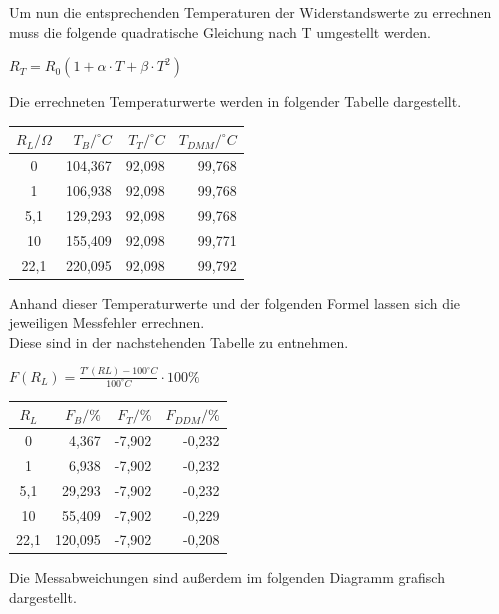 \documentclass[a4paper,11pt,oneside]{article}
\begin{document}
Um nun die entsprechenden Temperaturen der Widerstandswerte zu errechnen muss die folgende quadratische Gleichung nach T umgestellt werden.\\
\begin{center}
$R_T=R_0(1+\alpha \cdot T+\beta \cdot T^2)$\\


\end{center}
Die errechneten Temperaturwerte werden in folgender Tabelle dargestellt.
\begin{center}
\begin{tabular}{|c|r|r|r|}
\hline 
$R_L/\Omega$ & $T_B/^\circ C$ & $T_T/^\circ C$ & $T_{DMM}/^\circ C$ \\ 
\hline 
0 & 104,367& 92,098 & 99,768 \\ 
\hline 
1 & 106,938 & 92,098 & 99,768 \\ 
\hline 
5,1 & 129,293 & 92,098 & 99,768 \\ 
\hline 
10 & 155,409 & 92,098 & 99,771 \\ 
\hline 
22,1 & 220,095 & 92,098 & 99,792 \\ 
\hline 
\end{tabular} 
\end{center}
\vspace{1cm}
Anhand dieser Temperaturwerte und der folgenden Formel lassen sich die jeweiligen Messfehler errechnen.\\
Diese sind in der nachstehenden Tabelle zu entnehmen.
\begin{center}
$F(R_L)=\frac{T'(RL)-100^\circ C}{100^\circ C}\cdot 100\%$
\end{center}
\vspace{1cm}
\begin{center}
\begin{tabular}{|c|r|r|r|}
\hline 
$R_L$ & $F_B/\%$ & $F_T/\%$ & $F_{DDM}/\%$ \\ 
\hline 
0 & 4,367 & -7,902 & -0,232 \\ 
\hline 
1 & 6,938 & -7,902 & -0,232 \\ 
\hline 
5,1 & 29,293 & -7,902 & -0,232 \\ 
\hline 
10 & 55,409 & -7,902 & -0,229 \\ 
\hline 
22,1 & 120,095 & -7,902 & -0,208 \\ 
\hline 
\end{tabular} 
\end{center}
\newpage
Die Messabweichungen sind außerdem im folgenden Diagramm grafisch dargestellt.
\end{document}
